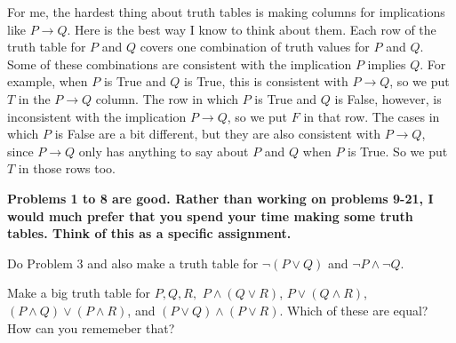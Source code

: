 For me, the hardest thing about truth tables is making columns for implications like $P \to Q$.
Here is the best way I know to think about them.
Each row of the truth table for $P$ and $Q$ covers one combination of truth values for $P$ and $Q$.
Some of these combinations are consistent with the implication $P$ implies $Q$.
For example, when $P$ is True and $Q$ is True, this is consistent with $P \to Q$, so we put $T$ in the $P \to Q$ column.
The row in which $P$ is True and $Q$ is False, however, is inconsistent with the implication $P \to Q$, so we put $F$ in that row.
The cases in which $P$ is False are a bit different, but they are also consistent with $P \to Q$, since $P \to Q$ only has anything to say about $P$ and $Q$ when $P$ is True.
So we put $T$ in those rows too.

{\bf Problems 1 to 8 are good.  Rather than working on problems 9-21, I would much prefer that you spend your time making some truth tables.
Think of this as a specific assignment.
\blist{0.0in}
\item Do Problem 3 and also make a truth table for $\neg (P \vee Q)$ and $\neg P \wedge \neg Q$.
\item Make a big truth table for $P, Q, R,$ $P \wedge (Q \vee R)$, $P \vee (Q \wedge R)$, $(P \wedge Q) \vee (P \wedge R)$, and $(P \vee Q) \wedge (P \vee R)$.  Which of these are equal?  How can you rememeber that?
\elist
}
\vfill          %
